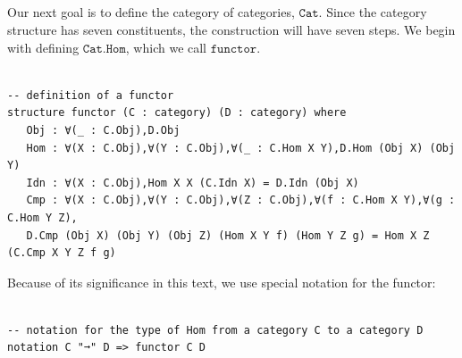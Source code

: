 \documentclass{book}
\newcounter{lcounter}
\newcounter{sectioncount}
\newcounter{subsectioncount}
\renewcommand{\section}[1]{\newpage
\ \\
\ \\
 \begin{center} \scalebox{1.5}{\texttt{\thesectioncount . #1}} \setcounter{sectioncount}{\thesectioncount+1} \setcounter{subsectioncount}{1} \end{center}
 \begin{center}

\ \\
\ \\

\thispagestyle{empty}
\end{center}
}
\begin{document}
\section{\texttt{Cat}}

Our next goal is to define the category of categories, $\texttt{Cat}$. Since the category structure has seven constituents, the construction will have seven steps. We begin with defining $\texttt{Cat.Hom}$, which we call $\texttt{functor}$.

\begin{center}
\begin{tcolorbox}[width=5in,colback={white},title={\begin{center}\texttt{Lean \thelcounter} \addtocounter{lcounter}{1}  \end{center}},colbacktitle=Blue,coltitle=black]
\begin{verbatim}

-- definition of a functor
structure functor (C : category) (D : category) where
   Obj : ∀(_ : C.Obj),D.Obj
   Hom : ∀(X : C.Obj),∀(Y : C.Obj),∀(_ : C.Hom X Y),D.Hom (Obj X) (Obj Y)
   Idn : ∀(X : C.Obj),Hom X X (C.Idn X) = D.Idn (Obj X)
   Cmp : ∀(X : C.Obj),∀(Y : C.Obj),∀(Z : C.Obj),∀(f : C.Hom X Y),∀(g : C.Hom Y Z),
   D.Cmp (Obj X) (Obj Y) (Obj Z) (Hom X Y f) (Hom Y Z g) = Hom X Z (C.Cmp X Y Z f g)

\end{verbatim}%
\end{tcolorbox}
\end{center}

Because of its significance in this text, we use special notation for the functor:

\begin{center}
\begin{tcolorbox}[width=5in,colback={white},title={\begin{center}\texttt{Lean \thelcounter} \addtocounter{lcounter}{1}  \end{center}},colbacktitle=Green,coltitle=black]
\begin{verbatim}

-- notation for the type of Hom from a category C to a category D
notation C "➞" D => functor C D

\end{verbatim}%
\end{tcolorbox}
\end{center}
\end{document}
